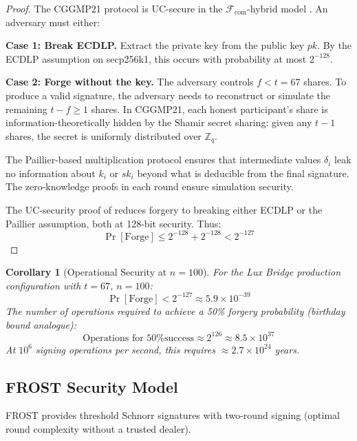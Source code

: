 \documentclass[11pt]{article}
\newtheorem{corollary}[theorem]{Corollary}
\begin{document}
\begin{proof}
The CGGMP21 protocol is UC-secure in the $\mathcal{F}_{\text{com}}$-hybrid model \cite{cgg21}. An adversary must either:

\textbf{Case 1: Break ECDLP.} Extract the private key from the public key $pk$. By the ECDLP assumption on secp256k1, this occurs with probability at most $2^{-128}$.

\textbf{Case 2: Forge without the key.} The adversary controls $f < t = 67$ shares. To produce a valid signature, the adversary needs to reconstruct or simulate the remaining $t - f \geq 1$ shares. In CGGMP21, each honest participant's share is information-theoretically hidden by the Shamir secret sharing: given any $t - 1$ shares, the secret is uniformly distributed over $\mathbb{Z}_q$.

The Paillier-based multiplication protocol ensures that intermediate values $\delta_i$ leak no information about $k_i$ or $sk_i$ beyond what is deducible from the final signature. The zero-knowledge proofs in each round ensure simulation security.

The UC-security proof of \cite{cgg21} reduces forgery to breaking either ECDLP or the Paillier assumption, both at 128-bit security. Thus:
\begin{equation}
\Pr[\text{Forge}] \leq 2^{-128} + 2^{-128} < 2^{-127}
\end{equation}
\end{proof}

\begin{corollary}[Operational Security at $n = 100$]
For the Lux Bridge production configuration with $t = 67$, $n = 100$:
\begin{equation}
\Pr[\text{Forge}] < 2^{-127} \approx 5.9 \times 10^{-39}
\end{equation}
The number of operations required to achieve a 50\% forgery probability (birthday bound analogue):
\begin{equation}
\text{Operations for 50\% success} \approx 2^{126} \approx 8.5 \times 10^{37}
\end{equation}
At $10^6$ signing operations per second, this requires $\approx 2.7 \times 10^{24}$ years.
\end{corollary}

\subsection{FROST Security Model}

FROST \cite{frost} provides threshold Schnorr signatures with two-round signing (optimal round complexity without a trusted dealer).
\end{document}
